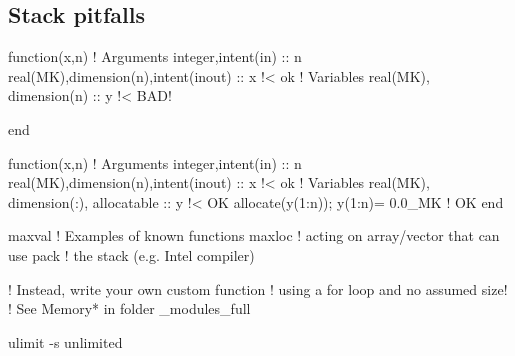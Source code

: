 \documentclass{article}
\begin{document}
\subsection{Stack pitfalls}
\begin{codea}
function(x,n)
! Arguments
integer,intent(in) :: n
real(MK),dimension(n),intent(inout) :: x !< ok
! Variables
real(MK), dimension(n) :: y !< BAD!

end
\end{codea} 
\begin{codeb}
function(x,n)
! Arguments
integer,intent(in) :: n
real(MK),dimension(n),intent(inout) :: x !< ok
! Variables
real(MK), dimension(:), allocatable :: y !< OK
allocate(y(1:n)); y(1:n)= 0.0_MK         !  OK
end
\end{codeb}
\begin{codea}
maxval  ! Examples of known functions 
maxloc  ! acting on array/vector that can use
pack    ! the stack (e.g. Intel compiler)
\end{codea} 
\begin{codeb}
! Instead, write your own custom function
! using a for loop and no assumed size!
! See Memory* in folder _modules_full
\end{codeb}
\begin{codea}
\end{codea} 
\begin{codeb}
ulimit -s unlimited
\end{codeb}


\end{document}
